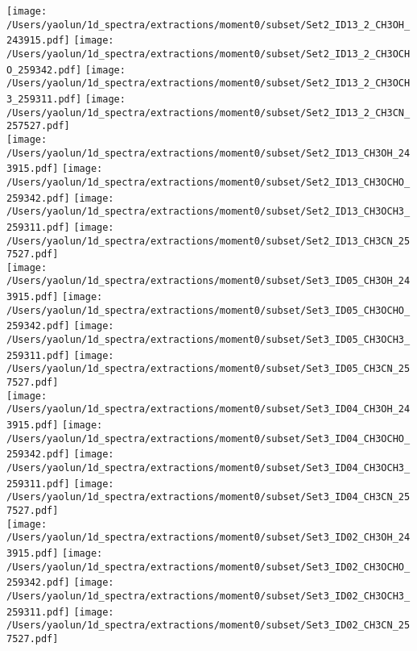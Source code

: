 \addtocounter{figure}{-1}
\begin{figure*}[htbp!]
  \centering
  \texttt{[image: /Users/yaolun/1d\_spectra/extractions/moment0/subset/Set2\_ID13\_2\_CH3OH\_243915.pdf]}
  \texttt{[image: /Users/yaolun/1d\_spectra/extractions/moment0/subset/Set2\_ID13\_2\_CH3OCHO\_259342.pdf]}
  \texttt{[image: /Users/yaolun/1d\_spectra/extractions/moment0/subset/Set2\_ID13\_2\_CH3OCH3\_259311.pdf]}
  \texttt{[image: /Users/yaolun/1d\_spectra/extractions/moment0/subset/Set2\_ID13\_2\_CH3CN\_257527.pdf]}
  \\
  \texttt{[image: /Users/yaolun/1d\_spectra/extractions/moment0/subset/Set2\_ID13\_CH3OH\_243915.pdf]}
  \texttt{[image: /Users/yaolun/1d\_spectra/extractions/moment0/subset/Set2\_ID13\_CH3OCHO\_259342.pdf]}
  \texttt{[image: /Users/yaolun/1d\_spectra/extractions/moment0/subset/Set2\_ID13\_CH3OCH3\_259311.pdf]}
  \texttt{[image: /Users/yaolun/1d\_spectra/extractions/moment0/subset/Set2\_ID13\_CH3CN\_257527.pdf]}
  \\
  \texttt{[image: /Users/yaolun/1d\_spectra/extractions/moment0/subset/Set3\_ID05\_CH3OH\_243915.pdf]}
  \texttt{[image: /Users/yaolun/1d\_spectra/extractions/moment0/subset/Set3\_ID05\_CH3OCHO\_259342.pdf]}
  \texttt{[image: /Users/yaolun/1d\_spectra/extractions/moment0/subset/Set3\_ID05\_CH3OCH3\_259311.pdf]}
  \texttt{[image: /Users/yaolun/1d\_spectra/extractions/moment0/subset/Set3\_ID05\_CH3CN\_257527.pdf]}
  \\
  \texttt{[image: /Users/yaolun/1d\_spectra/extractions/moment0/subset/Set3\_ID04\_CH3OH\_243915.pdf]}
  \texttt{[image: /Users/yaolun/1d\_spectra/extractions/moment0/subset/Set3\_ID04\_CH3OCHO\_259342.pdf]}
  \texttt{[image: /Users/yaolun/1d\_spectra/extractions/moment0/subset/Set3\_ID04\_CH3OCH3\_259311.pdf]}
  \texttt{[image: /Users/yaolun/1d\_spectra/extractions/moment0/subset/Set3\_ID04\_CH3CN\_257527.pdf]}
  \\
  \texttt{[image: /Users/yaolun/1d\_spectra/extractions/moment0/subset/Set3\_ID02\_CH3OH\_243915.pdf]}
  \texttt{[image: /Users/yaolun/1d\_spectra/extractions/moment0/subset/Set3\_ID02\_CH3OCHO\_259342.pdf]}
  \texttt{[image: /Users/yaolun/1d\_spectra/extractions/moment0/subset/Set3\_ID02\_CH3OCH3\_259311.pdf]}
  \texttt{[image: /Users/yaolun/1d\_spectra/extractions/moment0/subset/Set3\_ID02\_CH3CN\_257527.pdf]}
  \\
  \caption{}
\end{figure*}
